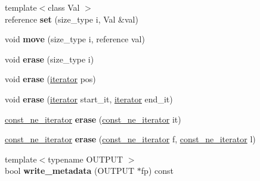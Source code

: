 \begin{DoxyCompactItemize}
\item 
{\footnotesize template$<$class Val $>$ }\\reference {\bfseries set} (size\+\_\+type i, Val \&val)\hypertarget{classspp___1_1sparsetable_acce36321af4fecfc06c88c189d759f4c}{}\label{classspp___1_1sparsetable_acce36321af4fecfc06c88c189d759f4c}

\item 
void {\bfseries move} (size\+\_\+type i, reference val)\hypertarget{classspp___1_1sparsetable_ada5bcd2468867bc3f5519e71dc66307d}{}\label{classspp___1_1sparsetable_ada5bcd2468867bc3f5519e71dc66307d}

\item 
void {\bfseries erase} (size\+\_\+type i)\hypertarget{classspp___1_1sparsetable_aec01299c21689130492b891ed48b20bb}{}\label{classspp___1_1sparsetable_aec01299c21689130492b891ed48b20bb}

\item 
void {\bfseries erase} (\hyperlink{classspp___1_1table__iterator}{iterator} pos)\hypertarget{classspp___1_1sparsetable_ae21789f44db07856244e72a743679f4a}{}\label{classspp___1_1sparsetable_ae21789f44db07856244e72a743679f4a}

\item 
void {\bfseries erase} (\hyperlink{classspp___1_1table__iterator}{iterator} start\+\_\+it, \hyperlink{classspp___1_1table__iterator}{iterator} end\+\_\+it)\hypertarget{classspp___1_1sparsetable_a85d9e83725abd7d23cd77e6091ba0fbb}{}\label{classspp___1_1sparsetable_a85d9e83725abd7d23cd77e6091ba0fbb}

\item 
\hyperlink{classspp___1_1_two__d__iterator}{const\+\_\+ne\+\_\+iterator} {\bfseries erase} (\hyperlink{classspp___1_1_two__d__iterator}{const\+\_\+ne\+\_\+iterator} it)\hypertarget{classspp___1_1sparsetable_a7effa0f6fbb4d594a81075f3dd0dbbd3}{}\label{classspp___1_1sparsetable_a7effa0f6fbb4d594a81075f3dd0dbbd3}

\item 
\hyperlink{classspp___1_1_two__d__iterator}{const\+\_\+ne\+\_\+iterator} {\bfseries erase} (\hyperlink{classspp___1_1_two__d__iterator}{const\+\_\+ne\+\_\+iterator} f, \hyperlink{classspp___1_1_two__d__iterator}{const\+\_\+ne\+\_\+iterator} l)\hypertarget{classspp___1_1sparsetable_a34b5530b7b1e9587c91369ae895549d7}{}\label{classspp___1_1sparsetable_a34b5530b7b1e9587c91369ae895549d7}

\item 
{\footnotesize template$<$typename O\+U\+T\+P\+UT $>$ }\\bool {\bfseries write\+\_\+metadata} (O\+U\+T\+P\+UT $\ast$fp) const \hypertarget{classspp___1_1sparsetable_a7566200e9d14256e8c203166f7d223de}{}\label{classspp___1_1sparsetable_a7566200e9d14256e8c203166f7d223de}


\end{DoxyCompactItemize}
